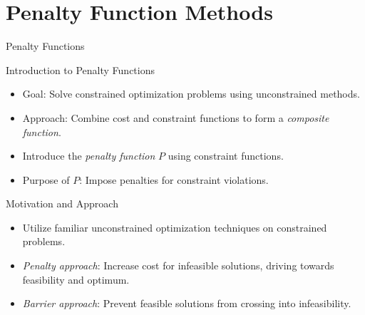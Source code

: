 \documentclass[
    NAME={Dr. Helga Ingimundardóttir},
    EMAIL={helgaingim@hi.is},
    FACULTY={Industrial Engineering},
    TITLE={Nonlinear Optimization},
    SUBTITLE={Approaches and Challenges},
    SEMINAR={VÉL113F},
    DATE={Design and Optimization}
]{../HI-latex/hi-beamer}
\begin{document}
    \section{Penalty Function Methods}
    \begin{frame}{Penalty Functions}
        \begin{block}{Introduction to Penalty Functions}
            \begin{itemize}
                \item Goal: Solve constrained optimization problems using unconstrained methods.
                \item Approach: Combine cost and constraint functions to form a \emph{composite function}.
                \item Introduce the \emph{penalty function} \( P \) using constraint functions.
                \item Purpose of \( P \): Impose penalties for constraint violations.
            \end{itemize}
        \end{block}

        \framebreak
        \alert{Motivation and Approach}
        \begin{itemize}
            \item Utilize familiar unconstrained optimization techniques on constrained problems.
            \item \emph{Penalty approach}: Increase cost for infeasible solutions, driving towards feasibility and optimum.
            \item \emph{Barrier approach}: Prevent feasible solutions from crossing into infeasibility.
        \end{itemize}


\end{frame}
\end{document}
